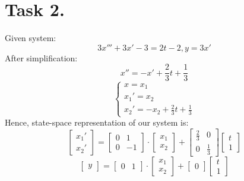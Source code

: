 \documentclass[a4paper,12pt]{article}
\begin{document}
\section{Task 2.}
Given system:
$$3x'''+3x'-3=2t-2, y=3x'$$
After simplification:
$$x''=-x'+\frac{2}{3}t+\frac{1}{3}$$
$$\begin{cases}
    x=x_1\\
    x_1'=x_2\\
    x_2'=-x_2+\frac{2}{3}t+\frac{1}{3}
\end{cases}$$
Hence, state-space representation of our system is:
\begin{equation*}
    \begin{bmatrix}
        x_1'\\x_2'
    \end{bmatrix}
    =
    \begin{bmatrix}
        0 & 1\\
        0 & -1
    \end{bmatrix}
    \cdot
    \begin{bmatrix}
        x_1 \\ x_2
    \end{bmatrix}
    +
    \begin{bmatrix}
        \frac{2}{3} & 0 \\
        0 & \frac{1}{3}
    \end{bmatrix}
    \begin{bmatrix}
        t \\ 1
    \end{bmatrix}
\end{equation*}
\begin{equation*}
    \begin{bmatrix}
        y
    \end{bmatrix}
    =
    \begin{bmatrix}
        0 & 1
    \end{bmatrix}
    \cdot
    \begin{bmatrix}
        x_1 \\ x_2
    \end{bmatrix}
    +
    \begin{bmatrix}
        0
    \end{bmatrix}
    \begin{bmatrix}
        t \\ 1
    \end{bmatrix}
\end{equation*}
\end{document}
